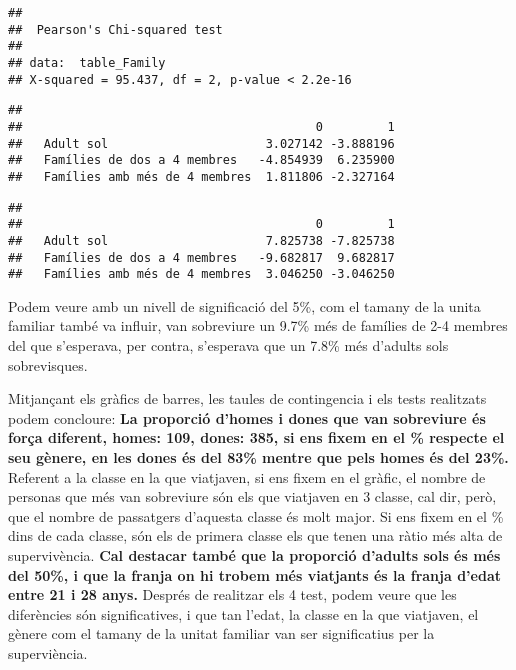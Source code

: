 \documentclass[]{article}
\newenvironment{Shaded}{\begin{snugshade}}{\end{snugshade}}
\newcommand{\DataTypeTok}[1]{\textcolor[rgb]{0.13,0.29,0.53}{#1}}
\newcommand{\KeywordTok}[1]{\textcolor[rgb]{0.13,0.29,0.53}{\textbf{#1}}}
\newcommand{\NormalTok}[1]{#1}
\newcommand{\OperatorTok}[1]{\textcolor[rgb]{0.81,0.36,0.00}{\textbf{#1}}}
\begin{document}
\begin{verbatim}
## 
##  Pearson's Chi-squared test
## 
## data:  table_Family
## X-squared = 95.437, df = 2, p-value < 2.2e-16
\end{verbatim}

\begin{Shaded}
\end{Shaded}

\begin{verbatim}
##                                
##                                         0         1
##   Adult sol                      3.027142 -3.888196
##   Famílies de dos a 4 membres   -4.854939  6.235900
##   Famílies amb més de 4 membres  1.811806 -2.327164
\end{verbatim}

\begin{Shaded}
\end{Shaded}

\begin{verbatim}
##                                
##                                         0         1
##   Adult sol                      7.825738 -7.825738
##   Famílies de dos a 4 membres   -9.682817  9.682817
##   Famílies amb més de 4 membres  3.046250 -3.046250
\end{verbatim}

Podem veure amb un nivell de significació del 5\%, com el tamany de la
unita familiar també va influir, van sobreviure un 9.7\% més de famílies
de 2-4 membres del que s'esperava, per contra, s'esperava que un 7.8\%
més d'adults sols sobrevisques.

Mitjançant els gràfics de barres, les taules de contingencia i els tests
realitzats podem concloure: \textbf{La proporció d'homes i dones que van
sobreviure és força diferent, homes: 109, dones: 385, si ens fixem en el
\% respecte el seu gènere, en les dones és del 83\% mentre que pels
homes és del 23\%. }Referent a la classe en la que viatjaven, si ens
fixem en el gràfic, el nombre de personas que més van sobreviure són els
que viatjaven en 3 classe, cal dir, però, que el nombre de passatgers
d'aquesta classe és molt major. Si ens fixem en el \% dins de cada
classe, són els de primera classe els que tenen una ràtio més alta de
supervivència. \textbf{Cal destacar també que la proporció d'adults sols
és més del 50\%, i que la franja on hi trobem més viatjants és la franja
d'edat entre 21 i 28 anys. }Després de realitzar els 4 test, podem veure
que les diferències són significatives, i que tan l'edat, la classe en
la que viatjaven, el gènere com el tamany de la unitat familiar van ser
significatius per la superviència.
\end{document}
